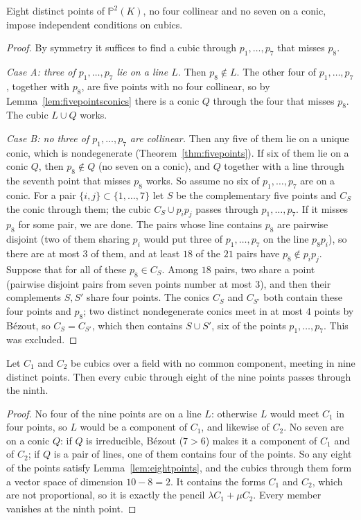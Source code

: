 \begin{lemma}\label{lem:eightpoints}
Eight distinct points of $\mathbb P^2(K)$, no four collinear and no seven on a conic, impose independent conditions on cubics.
\end{lemma}

\begin{proof}
By symmetry it suffices to find a cubic through $p_1,\dots,p_7$ that misses $p_8$.

\emph{Case A: three of $p_1,\dots,p_7$ lie on a line $L$.} Then $p_8\notin L$. The other four of $p_1,\dots,p_7$, together with $p_8$, are five points with no four
collinear, so by Lemma~\ref{lem:fivepointsconics} there is a conic $Q$ through the four that misses $p_8$. The cubic $L\cup Q$ works.

\emph{Case B: no three of $p_1,\dots,p_7$ are collinear.} Then any five of them lie on a unique conic, which is nondegenerate (Theorem~\ref{thm:fivepoints}).
If six of them lie on a conic $Q$, then $p_8\notin Q$ (no seven on a conic), and $Q$ together with a line through the seventh point that misses $p_8$ works. So
assume no six of $p_1,\dots,p_7$ are on a conic. For a pair $\{i,j\}\subset\{1,\dots,7\}$ let $S$ be the complementary five points and $C_S$ the conic through
them; the cubic $C_S\cup p_ip_j$ passes through $p_1,\dots,p_7$. If it misses $p_8$ for some pair, we are done. The pairs whose line contains $p_8$ are
pairwise disjoint (two of them sharing $p_i$ would put three of $p_1,\dots,p_7$ on the line $p_8p_i$), so there are at most $3$ of them, and at least $18$ of
the $21$ pairs have $p_8\notin p_ip_j$. Suppose that for all of these $p_8\in C_S$. Among $18$ pairs, two share a point (pairwise disjoint pairs from
seven points number at most $3$), and then their complements $S,S'$ share four points. The conics $C_S$ and $C_{S'}$ both contain these four points and $p_8$;
two distinct nondegenerate conics meet in at most $4$ points by B\'ezout, so $C_S=C_{S'}$, which then contains $S\cup S'$, six of the points
$p_1,\dots,p_7$. This was excluded.
\end{proof}

\begin{theorem}\label{thm:cayleybacharach}
Let $C_1$ and $C_2$ be cubics over a field with no common component, meeting in nine distinct points. Then every cubic through eight of the
nine points passes through the ninth.
\end{theorem}

\begin{proof}
No four of the nine points are on a line $L$: otherwise $L$ would meet $C_1$ in four points, so $L$ would be a component of $C_1$, and likewise of $C_2$.
No seven are on a conic $Q$: if $Q$ is irreducible, B\'ezout ($7>6$) makes it a component of $C_1$ and of $C_2$; if $Q$ is a pair of lines, one of them
contains four of the points. So any eight of the points satisfy Lemma~\ref{lem:eightpoints}, and the cubics through them form a vector space of dimension
$10-8=2$. It contains the forms $C_1$ and $C_2$, which are not proportional, so it is exactly the pencil $\lambda C_1+\mu C_2$. Every member vanishes at the ninth
point.
\end{proof}

